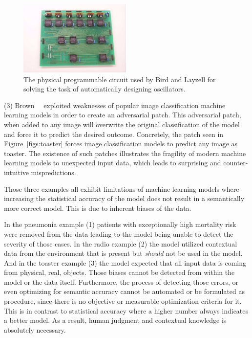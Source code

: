 \begin{figure}
\centering
\includegraphics[height=10em]{tex/introduction/emradio.png}
\caption[Programmable circuit to automatically design oscillators.]{
The physical programmable circuit used by Bird and Layzell \cite{Bird:2002:ERI:1251972.1252349} for solving the task of automatically designing oscillators.
}
\label{figs:emradio}
\end{figure}


\par \noindent (3)
Brown~\etal~\cite{2017arXiv171209665B} exploited weaknesses of popular image classification machine learning models in order to create an adversarial patch.
This adversarial patch, when added to any image will overwrite the original classification of the model and force it to predict the desired outcome.
Concretely, the patch seen in Figure~\ref{figs:toaster} forces image classification models to predict any image as toaster.
The existence of such patches illustrates the fragility of modern machine learning models to unexpected input data, which leads to surprising and counter-intuitive mispredictions.

Those three examples all exhibit limitations of machine learning models where increasing the statistical accuracy of the model does not result in a semantically more correct model.
This is due to inherent biases of the data.

In the pneumonia example (1) patients with exceptionally high mortality risk were removed from the data leading to the model being unable to detect the severity of those cases.
In the radio example (2) the model utilized contextual data from the environment that is present but \emph{should} not be used in the model.
And in the toaster example (3) the model expected that all input data is coming from physical, real, objects.
Those biases cannot be detected from within the model or the data itself.
Furthermore, the process of detecting those errors, or even optimizing for semantic accuracy cannot be automated or be formulated as procedure, since there is no objective or measurable optimization criteria for it.
This is in contrast to statistical accuracy where a higher number always indicates a better model.
As a result, human judgment and contextual knowledge is absolutely necessary.

